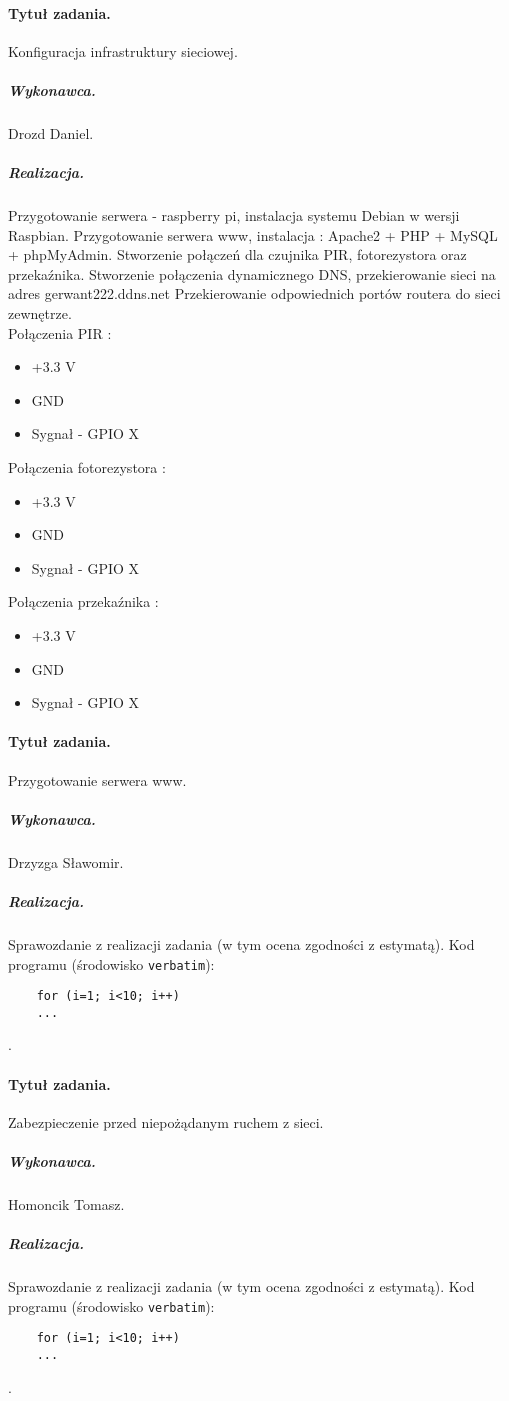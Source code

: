 	\paragraph{Tytuł zadania.} Konfiguracja infrastruktury sieciowej.
	\subparagraph{Wykonawca.} Drozd Daniel.
	\subparagraph{Realizacja.} Przygotowanie serwera - raspberry pi, instalacja systemu Debian w wersji Raspbian. Przygotowanie serwera www, instalacja : Apache2 + PHP + MySQL + phpMyAdmin.
							   Stworzenie połączeń dla czujnika PIR, fotorezystora oraz przekaźnika. Stworzenie połączenia dynamicznego DNS, przekierowanie sieci na adres gerwant222.ddns.net
							   Przekierowanie odpowiednich portów routera do sieci zewnętrze.
							   \\Połączenia PIR :
							   \begin{itemize}
							   	\item +3.3 V
							   	\item GND
							   	\item Sygnał - GPIO X
							   \end{itemize}
						   	   Połączenia fotorezystora :
						   	   \begin{itemize}
						   	   	\item +3.3 V
						   	   	\item GND
						   	   	\item Sygnał - GPIO X
						   	   \end{itemize}
						   	   Połączenia przekaźnika : 
						   	   \begin{itemize}
						   	   	\item +3.3 V
						   	   	\item GND
						   	   	\item Sygnał - GPIO X
						   	   \end{itemize}
						   	   
							   
	
	\paragraph{Tytuł zadania.} Przygotowanie serwera www.
	\subparagraph{Wykonawca.} Drzyzga Sławomir.
	\subparagraph{Realizacja.} Sprawozdanie z realizacji zadania (w tym ocena zgodności z estymatą). Kod programu (środowisko \texttt{verbatim}): \begin{verbatim}
	for (i=1; i<10; i++)
	...
	\end{verbatim}.
	
	\paragraph{Tytuł zadania.} Zabezpieczenie przed niepożądanym ruchem z sieci.
	\subparagraph{Wykonawca.} Homoncik Tomasz.
	\subparagraph{Realizacja.} Sprawozdanie z realizacji zadania (w tym ocena zgodności z estymatą). Kod programu (środowisko \texttt{verbatim}): \begin{verbatim}
	for (i=1; i<10; i++)
	...
	\end{verbatim}.
	
